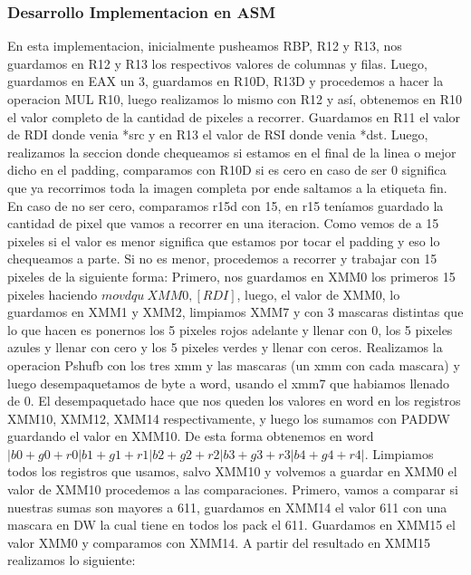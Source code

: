 \vspace*{0.3cm} \noindent
\subsubsection{Desarrollo Implementacion en ASM}
En esta implementacion, inicialmente pusheamos RBP, R12 y R13, nos guardamos en R12 y R13 los respectivos valores de columnas y filas.\newline
Luego, guardamos en EAX un 3, guardamos en R10D, R13D y procedemos a hacer la operacion MUL R10, luego realizamos lo mismo con R12 y así,
obtenemos en R10 el valor completo de la cantidad de pixeles a recorrer.\newline
Guardamos en R11 el valor de RDI donde venia *src y en R13 el valor de RSI donde venia *dst. \newline
Luego, realizamos la seccion donde chequeamos si estamos en el final de la linea o mejor dicho en el padding, comparamos con R10D si es cero \newline
en caso de ser 0 significa que ya recorrimos toda la imagen completa por ende saltamos a la etiqueta fin. \newline
En caso de no ser cero, comparamos r15d con 15, en r15 teníamos guardado la cantidad de pixel que vamos a recorrer en una iteracion.
Como vemos de a 15 pixeles si el valor es menor significa que estamos por tocar el padding y eso lo chequeamos a parte. \newline
Si no es menor, procedemos a recorrer y trabajar con 15 pixeles de la siguiente forma: \newline
Primero, nos guardamos en XMM0 los primeros 15 pixeles haciendo $ movdqu\  XMM0, [RDI]$, luego, el valor de XMM0,
lo guardamos en XMM1 y XMM2, limpiamos XMM7 y con 3 mascaras distintas que lo que hacen es ponernos los 5 pixeles rojos adelante y llenar con 0, 
los 5 pixeles azules y llenar con cero y los 5 pixeles verdes y llenar con ceros. \newline
Realizamos la operacion Pshufb con los tres xmm y las mascaras (un xmm con cada mascara) y luego desempaquetamos de byte a word,
usando el xmm7 que habiamos llenado de 0. \newline
El desempaquetado hace que nos queden los valores en word en los registros XMM10, XMM12, XMM14 respectivamente, y luego
los sumamos con PADDW guardando el valor en XMM10. De esta forma obtenemos en word 
$|b0 + g0 + r0|b1 + g1 + r1|b2 + g2 + r2|b3 + g3 + r3|b4 + g4 + r4|$. \newline
Limpiamos todos los registros que usamos, salvo XMM10 y volvemos a guardar en XMM0 el valor de XMM10 procedemos a las comparaciones.
Primero, vamos a comparar si nuestras sumas son mayores a 611, guardamos en XMM14 el valor 611 con una mascara en DW la cual tiene en todos los pack
el 611. Guardamos en XMM15 el valor XMM0 y comparamos con XMM14.
A partir del resultado en XMM15 realizamos lo siguiente:\newline

